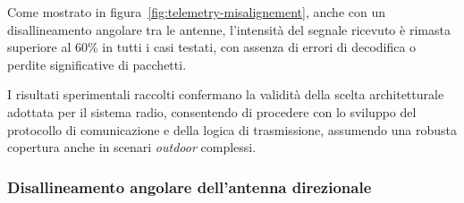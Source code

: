 \documentclass[12pt,a4paper,twoside]{book}
\begin{document}
Come mostrato in figura~\ref{fig:telemetry-misalignement}, anche con un disallineamento angolare
tra le antenne, l’intensità del segnale ricevuto è rimasta superiore al 60\% in tutti i casi testati,
con assenza di errori di decodifica o perdite significative di pacchetti.

I risultati sperimentali raccolti confermano la validità della scelta architetturale
adottata per il sistema radio, consentendo di procedere con lo sviluppo del
protocollo di comunicazione e della logica di trasmissione, assumendo una robusta
copertura anche in scenari \emph{outdoor} complessi.

\subsubsection{Disallineamento angolare dell'antenna direzionale}
\begin{table}[H]
    \centering
    \caption{Intensità del segnale (\%) in funzione del disallineamento angolare dell'antenna direzionale e della distanza}
    \label{tab:signal-strength-directional}
\end{table}
\end{document}

